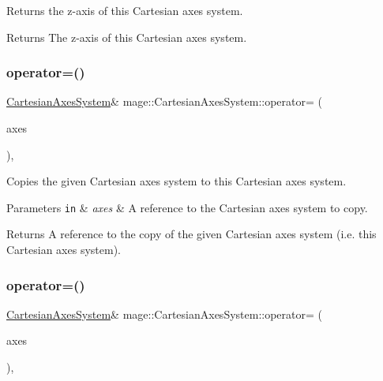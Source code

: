 Returns the z-\/axis of this Cartesian axes system.

\begin{DoxyReturn}{Returns}
The z-\/axis of this Cartesian axes system. 
\end{DoxyReturn}
\hypertarget{structmage_1_1_cartesian_axes_system_a4774ba4da5b34cdd0f179864ee6e77fd}{}\label{structmage_1_1_cartesian_axes_system_a4774ba4da5b34cdd0f179864ee6e77fd} 
\subsubsection{\texorpdfstring{operator=()}{operator=()}\hspace{0.1cm}{\footnotesize\ttfamily [1/2]}}
{\footnotesize\ttfamily \hyperlink{structmage_1_1_cartesian_axes_system}{Cartesian\+Axes\+System}\& mage\+::\+Cartesian\+Axes\+System\+::operator= (\begin{DoxyParamCaption}\item[{const \hyperlink{structmage_1_1_cartesian_axes_system}{Cartesian\+Axes\+System} \&}]{axes }\end{DoxyParamCaption})\hspace{0.3cm}{\ttfamily [default]}, {\ttfamily [noexcept]}}

Copies the given Cartesian axes system to this Cartesian axes system.


\begin{DoxyParams}[1]{Parameters}
\mbox{\tt in}  & {\em axes} & A reference to the Cartesian axes system to copy. \\
\hline
\end{DoxyParams}
\begin{DoxyReturn}{Returns}
A reference to the copy of the given Cartesian axes system (i.\+e. this Cartesian axes system). 
\end{DoxyReturn}
\hypertarget{structmage_1_1_cartesian_axes_system_ac46d36a50bc7a310cf79beca834f44c6}{}\label{structmage_1_1_cartesian_axes_system_ac46d36a50bc7a310cf79beca834f44c6} 
\subsubsection{\texorpdfstring{operator=()}{operator=()}\hspace{0.1cm}{\footnotesize\ttfamily [2/2]}}
{\footnotesize\ttfamily \hyperlink{structmage_1_1_cartesian_axes_system}{Cartesian\+Axes\+System}\& mage\+::\+Cartesian\+Axes\+System\+::operator= (\begin{DoxyParamCaption}\item[{\hyperlink{structmage_1_1_cartesian_axes_system}{Cartesian\+Axes\+System} \&\&}]{axes }\end{DoxyParamCaption})\hspace{0.3cm}{\ttfamily [default]}, {\ttfamily [noexcept]}}

